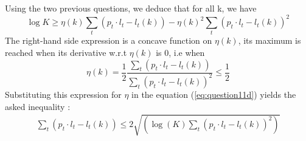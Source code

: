  Using the two previous questions, we deduce that for all k, we have 
\begin{equation}
	\log{K} \geqslant \eta(k) \sum_t (p_t \cdot l_t - l_t(k)) - \eta(k)^2 \sum_t (p_t \cdot l_t - l_t(k))^2
	\label{eq:question11d}
\end{equation}
The right-hand side expression is a concave function on $\eta(k)$, its maximum is reached when its derivative w.r.t $\eta(k)$ is 0, i.e when 
\begin{equation}
	\eta(k) = \frac{1}{2} \frac{\sum_t (p_t \cdot l_t - l_t(k))}{\sum_t (p_t \cdot l_t - l_t(k))^2} \leqslant \frac{1}{2}
\end{equation}
Substituting this expression for $\eta$ in the equation (\ref{eq:question11d}) yields the asked inequality : 
\begin{align*}
	\sum_t (p_t \cdot l_t - l_t(k)) \leqslant 2 \sqrt{(\log(K) \sum_t (p_t \cdot l_t - l_t(k))^2 )}
\end{align*}

